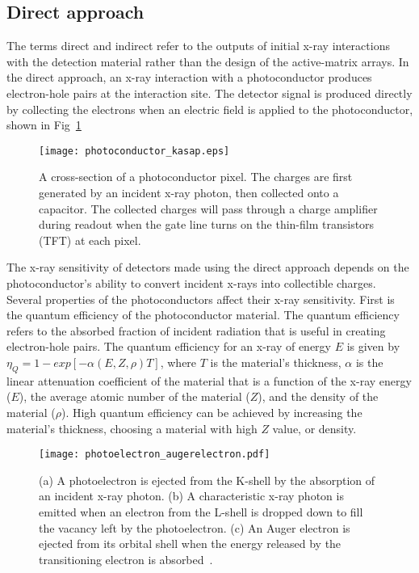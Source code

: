\subsection{Direct approach}
The terms direct and indirect refer to the outputs of initial x-ray interactions with the detection material rather than the design of the active-matrix arrays.  In the direct approach, an x-ray interaction with a photoconductor produces electron-hole pairs at the interaction site.  The detector signal is produced directly by collecting the electrons when an electric field is applied to the photoconductor, shown in Fig~\ref{fig:photoconductor_cross_section}
%
\begin{figure}[ht]
\centering
\texttt{[image: photoconductor\_kasap.eps]}
\caption{A cross-section of a photoconductor pixel\protect\footnotemark.  The charges are first generated by an incident x-ray photon, then collected onto a capacitor.  The collected charges will pass through a charge amplifier during readout when the gate line turns on the thin-film transistors (TFT) at each pixel.}
\label{fig:photoconductor_cross_section}
\end{figure}


The x-ray sensitivity of detectors made using the direct approach depends on the photoconductor's ability to convert incident x-rays into collectible charges.  Several properties of the photoconductors affect their x-ray sensitivity.  First is the quantum efficiency of the photoconductor material.  The quantum efficiency refers to the absorbed fraction of incident radiation that is useful in creating electron-hole pairs.  The quantum efficiency for an x-ray of energy $E$ is given by $\eta_Q = 1 - exp[-\alpha (E, Z, \rho) T]$, where $T$ is the material's thickness, $\alpha$ is the linear attenuation coefficient of the material that is a function of the x-ray energy ($E$), the average atomic number of the material ($Z$), and the density of the material ($\rho$).  High quantum efficiency can be achieved by increasing the material's thickness, choosing a material with high $Z$ value, or density.  

\begin{figure}
\texttt{[image: photoelectron\_augerelectron.pdf]}
\caption{(a) A photoelectron is ejected from the K-shell by the absorption of an incident x-ray photon. (b) A characteristic x-ray photon is emitted when an electron from the L-shell is dropped down to fill the vacancy left by the photoelectron. (c) An Auger electron is ejected from its orbital shell when the energy released by the transitioning electron is absorbed~\citep{wiki_photoelectric}.}
\label{fig:photoelectric}
\end{figure}

